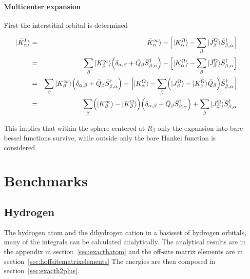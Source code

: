 \documentclass[11pt,a4paper]{report}
\begin{document}
\subsubsection{Multicenter expansion}

First the interstitial orbital is determined

\begin{eqnarray}
|\bar{K}^I_\alpha\rangle&=&|\bar{K}^\infty_\alpha\rangle 
- \Bigl[ |K^\Omega_\alpha\rangle 
-\sum_\beta |\bar{J}^\Omega_\beta\rangle \bar{S}^\dagger_{\beta,\alpha}
\Bigr]
\nonumber\\
&=&\sum_\beta |K^\infty_\beta\rangle \Bigl(\delta_{\alpha,\beta}+\bar{Q}_\beta
\bar{S}^\dagger_{\beta,\alpha}\Bigr)
- \Bigl[ |K^\Omega_\alpha\rangle 
-\sum_\beta |\bar{J}^\Omega_\beta\rangle \bar{S}^\dagger_{\beta,\alpha}
\Bigr]
\nonumber\\
&=&\sum_\beta |K^\infty_\beta\rangle \Bigl(\delta_{\alpha,\beta}+\bar{Q}_\beta
\bar{S}^\dagger_{\beta,\alpha}\Bigr)
- \Bigl[ |K^\Omega_\alpha\rangle 
-\sum_\beta 
\Bigl(
|J^\Omega_\beta\rangle-|K^\Omega_\beta\rangle\bar{Q}_\beta\Bigr)
 \bar{S}^\dagger_{\beta,\alpha}
\Bigr]
\nonumber\\
&=&\sum_\beta 
\Bigl(|K^\infty_\beta\rangle -|K^\Omega_\beta\rangle \Bigr)
\Bigl(\delta_{\alpha,\beta}+\bar{Q}_\beta
\bar{S}^\dagger_{\beta,\alpha}\Bigr)
+\sum_\beta 
|J^\Omega_\beta\rangle\bar{S}^\dagger_{\beta,\alpha}
\end{eqnarray}

This implies that within the sphere centered at $R_\beta$ only the
expansion into bare bessel functions survive, while outside only the
bare Hankel function is considered.




\chapter{Benchmarks}
\section{Hydrogen}
The hydrogen atom and the dihydrogen cation in a basisset of hydrogen
orbitals, many of the integrals can be calculated analytically.  The
analytical results are in the appendix in section~\ref{sec:exacthatom}
and the off-site matrix elements are in
section~\ref{sec:hoffsitematrixelements} The energies are then
composed in section~\ref{sec:exacth2plus}.
\end{document}
